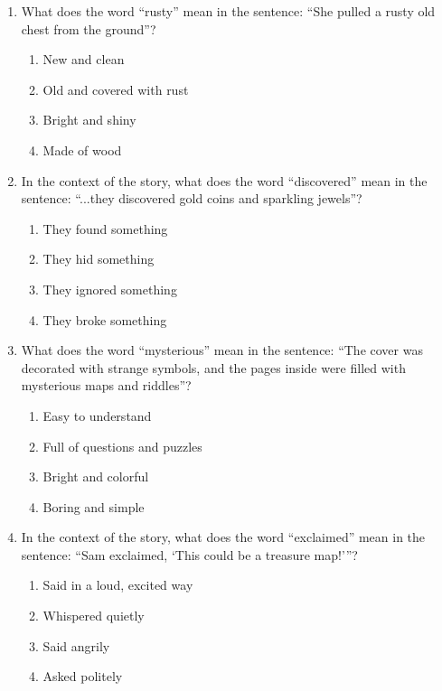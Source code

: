 \documentclass[12pt]{article}
\begin{document}
\begin{enumerate}
    \item What does the word “rusty” mean in the sentence: “She pulled a rusty old chest from the ground”?
    \begin{enumerate}[label=\Alph*.]
        \item New and clean
        \item Old and covered with rust
        \item Bright and shiny
        \item Made of wood
    \end{enumerate}
    \vspace{0.5cm}

    \item In the context of the story, what does the word “discovered” mean in the sentence: “...they discovered gold coins and sparkling jewels”?
    \begin{enumerate}[label=\Alph*.]
        \item They found something
        \item They hid something
        \item They ignored something
        \item They broke something
    \end{enumerate}
    \vspace{0.5cm}

\vspace{3cm}
    \item What does the word “mysterious” mean in the sentence: “The cover was decorated with strange symbols, and the pages inside were filled with mysterious maps and riddles”?
    \begin{enumerate}[label=\Alph*.]
        \item Easy to understand
        \item Full of questions and puzzles
        \item Bright and colorful
        \item Boring and simple
    \end{enumerate}
    \vspace{0.5cm}

    \item In the context of the story, what does the word “exclaimed” mean in the sentence: “Sam exclaimed, ‘This could be a treasure map!’”?
    \begin{enumerate}[label=\Alph*.]
        \item Said in a loud, excited way
        \item Whispered quietly
        \item Said angrily
        \item Asked politely
    \end{enumerate}
    \vspace{0.5cm}


\end{enumerate}
\end{document}
